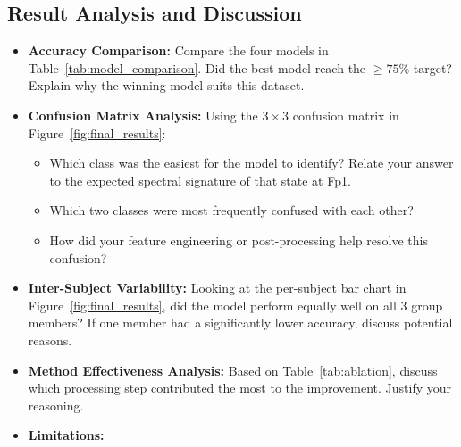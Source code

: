 \subsection{Result Analysis and Discussion}
\begin{itemize}[leftmargin=*]
    \item \textbf{Accuracy Comparison:} Compare the four models in Table~\ref{tab:model_comparison}. Did the best model reach the $\geq 75\%$ target? Explain why the winning model suits this dataset.
    \item \textbf{Confusion Matrix Analysis:} Using the $3 \times 3$ confusion matrix in Figure~\ref{fig:final_results}:
    \begin{itemize}
        \item Which class was the easiest for the model to identify? Relate your answer to the expected spectral signature of that state at Fp1.
        \item Which two classes were most frequently confused with each other?
        \item How did your feature engineering or post-processing help resolve this confusion?
    \end{itemize}
    \item \textbf{Inter-Subject Variability:} Looking at the per-subject bar chart in Figure~\ref{fig:final_results}, did the model perform equally well on all 3 group members? If one member had a significantly lower accuracy, discuss potential reasons.
    \item \textbf{Method Effectiveness Analysis:} Based on Table~\ref{tab:ablation}, discuss which processing step contributed the most to the improvement. Justify your reasoning.
    \item \textbf{Limitations:} 
\end{itemize}